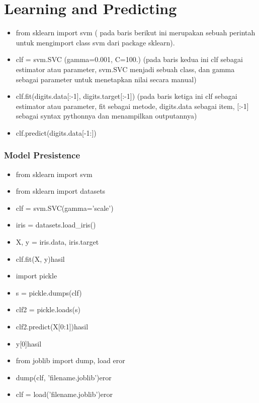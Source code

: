 \section{Learning and Predicting}
\begin{itemize}
\item from sklearn import svm ( pada baris berikut ini merupakan sebuah perintah untuk mengimport class svm dari package sklearn).
\item clf = svm.SVC (gamma=0.001, C=100.) (pada baris kedua ini clf sebagai estimator atau parameter, svm.SVC menjadi sebuah class, dan gamma sebagai parameter untuk menetapkan nilai secara manual)
\item clf.fit(digits.data[:-1], digits.target[:-1]) (pada baris ketiga ini clf sebagai estimator atau parameter, fit sebagai metode, digits.data sebagai item, [:-1] sebagai syntax pythonnya dan menampilkan outputannya)
\item clf.predict(digits.data[-1:])
\end{itemize}
\subsubsection{Model Presistence}
\begin{itemize}
\item from sklearn import svm
\item from sklearn import datasets
\item clf = svm.SVC(gamma='scale')
\item iris = datasets.load\_iris()
\item X, y = iris.data, iris.target
\item clf.fit(X, y)hasil
\item import pickle
\item s = pickle.dumps(clf)
\item clf2 = pickle.loads(s)
\item clf2.predict(X[0:1])hasil
\item y[0]hasil
\item from joblib import dump, load eror
\item dump(clf, 'filename.joblib')eror
\item clf = load('filename.joblib')eror
\end{itemize}

